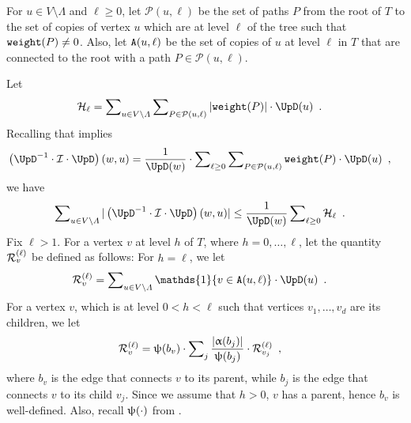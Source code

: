 \documentclass[11pt,reqno]{amsart}
\numberwithin{equation}{section}
\newcommand{\cI}{{\mathcal{I}}}
\newcommand{\cP}{{\mathcal{P}}}
\newcommand{\applegreen}[1]{ {\color{applegreen}#1}}
\newcommand{\blue}[1]{{\color{blue}#1}}
\newcommand{\cadmiumorange}[1]{{\color{cadmiumorange}#1}}
\newcommand{\coquelicot}[1]{{\color{coquelicot}#1}}
\newcommand{\deeppink}[1]{{\color{deeppink}#1}}
\newcommand{\electricviolet}[1]{{\color{electricviolet}#1}}
\newcommand{\goldenbrown}[1]{{\color{goldenbrown}#1}}
\newcommand{\red}[1]{{\color{red}#1}}
\newcommand{\Ind}{\mathds{1}}
\newcommand{\cp}{{\tt A}}
\newcommand{\infmatrix}{\cI}
\newcommand{\abs}[1]{\blue{|}#1\blue{|}}
\renewcommand{\applegreen}[1]{#1}
\renewcommand{\blue}[1]{#1}
\renewcommand{\cadmiumorange}[1]{#1}
\renewcommand{\coquelicot}[1]{#1}
\renewcommand{\deeppink}[1]{#1}
\renewcommand{\electricviolet}[1]{#1}
\renewcommand{\goldenbrown}[1]{#1}
\renewcommand{\red}[1]{#1}
\newcommand{\kb}{\deeppink{b}}
\newcommand{\kh}{\cadmiumorange{h}}
\newcommand{\kj}{\coquelicot{j}}
\newcommand{\kell}{{\color{green(pigment)}\ell}}%
\newcommand{\kP}{\goldenbrown{P}}
\newcommand{\ku}{\red{u}}
\newcommand{\kv}{\electricviolet{v}}
\newcommand{\kw}{\blue{w}}
\renewcommand{\kb}{b}
\renewcommand{\kh}{h}
\renewcommand{\kj}{j}
\renewcommand{\kell}{\ell}
\renewcommand{\kP}{P}
\renewcommand{\ku}{u}
\renewcommand{\kv}{v}
\renewcommand{\kw}{w}
\newcommand{\infweight}{\upalpha}
\begin{document}
For $\ku\in V\setminus \Lambda$ and $\kell\geq 0$, let $\cP(\ku,\kell)$ be the set of paths $\kP$ from the root of $T$ to 
the set of copies of  vertex $\ku$ which are at level  $\kell$ of the tree such that  ${\tt weight}(\kP)\neq 0$. Also,  let 
$\cp(\ku,\kell)$ be the set of copies of $\ku$ at level $\kell$ in $T$ that are connected to the root with a path $\kP\in \cP(\ku,\kell)$.



Let
\begin{align}\label{eq:DefOfCalHL}
\inflPotB_{\kell} & =%
 \sum\nolimits_{\ku \in V\setminus \Lambda} \sum\nolimits_{\kP \in \cP(\ku, \kell) }
\abs{ {\tt weight}(\kP ) } \cdot \UpD(\ku) \enspace.
\end{align}
Recalling that  implies 
\begin{align}\label{eq:DescOfbCru}
\textstyle \left( \UpD^{-1}\cdot \infmatrix\cdot \UpD \right) (\kw,\ku) & =\frac{1}{\UpD(\kw)} \cdot \sum\nolimits_{\kell \geq 0} \sum\nolimits_{\kP \in \cP(\ku,\kell)}{\tt weight}(\kP) \cdot \UpD(\ku)\enspace,
\end{align}
we have
% 
\begin{align}\label{eq:bCVsbCELL}
 \sum\nolimits_{\ku\in V\setminus \Lambda } \abs{\left( \UpD^{-1}\cdot \infmatrix\cdot \UpD \right) (\kw,\ku)} & 
 \leq \frac{1}{\UpD(\kw)} \sum\nolimits_{\kell\geq 0} \inflPotB_{\kell} 
\enspace .
\end{align}
Fix $\kell> 1$. For a vertex $\kv$ at level $\kh$ of $T$, where $\kh=0, \ldots, \kell$, 
let the quantity $\subcont_{\kv}$ be defined as follows: 
%
For $\kh=\kell$, we let
\begin{align} \label{eq:SRecurBaseWeights}
\subcont_{\kv} & = \sum\nolimits_{\ku \in V\setminus \Lambda} \Ind\{\kv \in \cp (\ku,\kell)\} \cdot \UpD(\ku) \enspace.
\end{align}
For a vertex $\kv$, which is at level $0< \kh <\kell$ such that vertices $\kv_1, \ldots, \kv_d$ are its children, we let
\begin{align} \label{eq:SRecurStepHC1821}
\subcont_{\kv}&= 
\chiofh(\kb_{\kv})\cdot \sum\nolimits_{\kj}
\frac{\abs{\infweight(\kb_{\kj})}}{\chiofh(\kb_{\kj})} \cdot \subcont_{\kv_{\kj}} \enspace,
\end{align}
where $\kb_{\kv}$ is the edge that connects $\kv$ to its parent, while $\kb_{\kj}$ is the edge that connects $\kv$
to its child $\kv_{\kj}$. Since we assume that $\kh>0$, $\kv$ has a parent,  hence $\kb_{\kv}$ is well-defined.
%
Also, recall $\uppsi(\cdot)$ from . 
\end{document}
